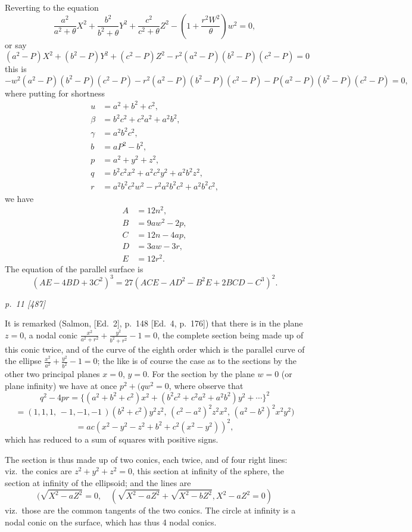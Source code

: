 \documentclass[11pt,a4paper]{book}
\begin{document}
Reverting to the equation
\[
\frac{a^2}{a^2 + \theta}X^2 + \frac{b^2}{b^2 + \theta}Y^2 + \frac{c^2}{c^2 + \theta}Z^2 - \left(1 + \frac{r^2 W^2}{\theta}\right)w^2 = 0,
\]
or say
\[
(a^2 - P)X^2 + (b^2 - P)Y^2 + (c^2 - P)Z^2 - r^2(a^2 - P)(b^2 - P)(c^2 - P) = 0
\]
this is
\[
-w^2(a^2 - P)(b^2 - P)(c^2 - P) - r^2(a^2 - P)(b^2 - P)(c^2 - P) - P(a^2 - P)(b^2 - P)(c^2 - P) = 0,
\]
where putting for shortness
\begin{align*}
u &= a^2 + b^2 + c^2, \\
\beta &= b^2c^2 + c^2a^2 + a^2b^2, \\
\gamma &= a^2b^2c^2, \\
b &= aP^2 - b^2,\\
p &= a^2 + y^2 + z^2,\\
q &= b^2c^2x^2 + a^2c^2y^2 + a^2b^2z^2, \\
r &= a^2b^2c^2w^2 - r^2 a^2 b^2 c^2 + a^2 b^2 c^2 ,
\end{align*}
we have
\begin{align*}
A &= 12n^2, \\
B &= 9aw^2 - 2p, \\
C &= 12n - 4ap, \\
D &= 3aw - 3r, \\
E &= 12r^2.
\end{align*}
The equation of the parallel surface is
\[
(A E - 4 B D + 3 C^2)^3 = 27(A C E - A D^2 - B^2 E + 2 B C D - C^3)^2.
\]

\clearpage

\bigskip
\textit{p.~11 [487]}
\smallskip

It is remarked (Salmon, [Ed.\ 2], p.~148 [Ed.\ 4, p.~176]) that there is in the plane
$z = 0$, a nodal conic $\frac{x^2}{a^2 + r^2} + \frac{y^2}{b^2 + r^2} - 1 = 0$, the complete section being made up
of this conic twice, and of the curve of the eighth order which is the parallel curve
of the ellipse $\frac{x^2}{a^2} + \frac{y^2}{b^2} - 1 = 0$; the like is of course the case as to the sections by
the other two principal planes $x = 0$, $y = 0$.  For the section by the plane $w = 0$
(or plane infinity) we have at once $p^2 + (q w^2 = 0$, where observe that
\[
q^2 - 4pr = \{(a^2 + b^2 + c^2)x^2 + (b^2 c^2 + c^2 a^2 + a^2 b^2)y^2 + \cdots\}^2
\]
\[
= (1, 1, 1, \, -1, -1, -1 \,)(b^2 + c^2)y^2 z^2, \, (c^2 - a^2)^2 z^2 x^2, \, (a^2 - b^2)^2 x^2 y^2)
\]
\[
= ac (x^2 - y^2 - z^2 + b^2 + c^2 (x^2 - y^2))^2,
\]
which has reduced to a sum of squares with positive signs.

The section is thus made up of two conics, each twice, and of four right lines: viz.\
the conics are $z^2 + y^2 + z^2 = 0$, this section at infinity of the sphere, the section at
infinity of the ellipsoid; and the lines are
\[
(\sqrt{X^2 - aZ^2} = 0, \quad (\sqrt{X^2 - aZ^2} + \sqrt{X^2 - bZ^2}, X^2 - aZ^2 = 0)
\]
viz.\ those are the common tangents of the two conics.  The circle at infinity is a nodal conic on the surface, which has thus 4 nodal conics.
\end{document}
